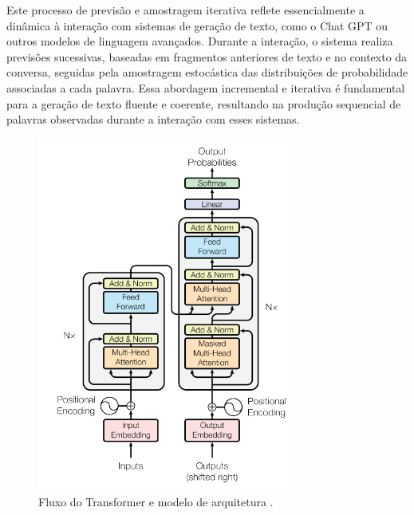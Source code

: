 \documentclass[10pt, conference, compsocconf]{IEEEtran}
\begin{document}
Este processo de previsão e amostragem iterativa reflete essencialmente a dinâmica  à interação com sistemas de geração de texto, como o Chat GPT ou outros modelos de linguagem avançados. Durante a interação, o sistema realiza previsões sucessivas, baseadas em fragmentos anteriores de texto e no contexto da conversa, seguidas pela amostragem estocástica das distribuições de probabilidade associadas a cada palavra. Essa abordagem incremental e iterativa é fundamental para a geração de texto fluente e coerente, resultando na produção sequencial de palavras observadas durante a interação com esses sistemas.

\FloatBarrier

\begin{figure}[!h]
\centering
\includegraphics[width=3.3in]{images/The Transformer - model architecture.png}
\caption{Fluxo do Transformer e modelo de arquitetura \cite{Attention-Is-All-You-Need}.} 
\label{fig:arquiteturaTransformer}
\end{figure}

\FloatBarrier
\end{document}
